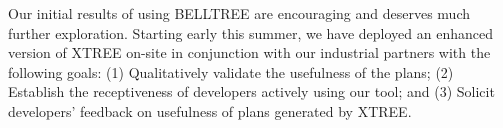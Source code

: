 \documentclass[conference]{IEEEtran}
\theoremstyle{break}
\begin{document}

Our initial results of using BELLTREE are encouraging and deserves much further exploration. Starting early this summer, we have deployed an enhanced version of XTREE on-site in conjunction with our industrial partners with the following goals: (1) Qualitatively validate the usefulness of the plans; (2) Establish the receptiveness of developers actively using our tool; and (3) Solicit developers' feedback on usefulness of plans generated by XTREE.  



\end{document}
